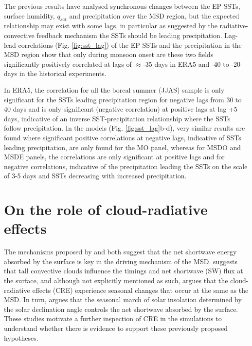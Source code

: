 The previous results have analysed synchronous changes between the EP SSTs, surface humidity, $q_{sat}$ and precipitation over the MSD region, but the expected relationship may exist with some lags, in particular as suggested by the radiative-convective feedback mechanism the SSTs should be leading precipitation. 
Lag-lead correlations (Fig. \ref{fig:sst_lag}) of the EP SSTs and the precipitation in the MSD region show that only during monsoon onset are these two fields significantly positively correlated at lags of $\approx$-35 days in ERA5 and -40 to -20 days in the historical experiments. 

In ERA5, the correlation for all the boreal summer (JJAS) sample is only significant for the SSTs leading  precipitation region for negative lags from 30 to 40 days and is only significant (negative correlation) at positive lags at lag +5 days, indicative of an inverse SST-precipitation relationship where the SSTs follow precipitation. 
In the models (Fig. \ref{fig:sst_lag}b-d), very similar results are found where significant positive correlations at negative lags, indicative of SSTs leading precipitation, are only found for the MO panel, whereas for MSDO and MSDE panels, the correlations are only significant at positive lags and for negative correlations, indicative of the precipitation leading the SSTs on the scale of 3-5 days and SSTs decreasing with increased precipitation.




\section{On the role of cloud-radiative effects}


The mechanisms proposed by \cite{magana1999} and \cite{karnauskas2013} both suggest that the net shortwave energy absorbed by the surface is key in the driving mechanism of the MSD. \cite{magana1999} suggests that tall convective clouds influence the timings and net shortwave (SW) flux at the surface, and although not explicitly mentioned as such, \cite{magana1999} argues that the cloud-radiative effects (CRE) experience seasonal changes that occur at the same as the MSD. In turn, \cite{karnauskas2013} argues that the seasonal march of solar insolation determined by the solar declination angle controls the net shortwave absorbed by the surface. These studies motivate a further inspection of CRE in the simulations to understand whether there is evidence to support these previously proposed hypotheses.



